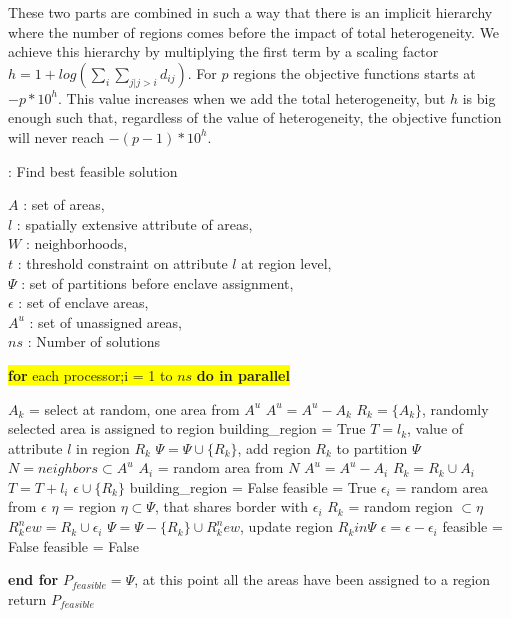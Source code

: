 \documentclass[conference]{IEEEtran}
\begin{document}
These two parts are combined in such a way that there is an implicit
hierarchy where the number of regions comes before the impact of total
heterogeneity. We achieve this hierarchy by multiplying the first term by a
scaling factor $h = 1 + log(\sum_i \sum_{j|j>i} d_{ij})$. For $p$ regions the
objective functions starts at $−p\ast10^h$. This value increases when we add the
total heterogeneity, but $h$ is big enough such that, regardless of the value of
heterogeneity, the objective function will never reach $-(p-1) \ast 10^h$.

\begin{algorithm}
\scriptsize
\caption{: Find best feasible solution~\cite{r1}}
$A$ : set of areas,\\
$l$ : spatially extensive attribute of areas,\\
$W$ : neighborhoods,\\
$t$ : threshold constraint on attribute $l$ at region level,\\
$\Psi$ : set of partitions before enclave assignment,\\
$\epsilon$ : set of enclave areas,\\
$A^u$ : set of unassigned areas,\\
$ns$ : Number of solutions\\
\begin{algorithmic}
\vbox{\colorbox{yellow}{\vbox{\STATE \textbf{for} each processor;i = 1 to $ns$ \textbf{do in parallel}}}} 
\begin{ALC@g}
		\STATE $A_k$ = select at random, one area from $A^u$
		\STATE $A^u = A^u - A_k$
		\STATE $R_k = \{A_k\}$, randomly selected area is assigned to region
		\STATE building\_region = True
		\STATE $T = l_k$, value of attribute $l$ in region $R_k$
				\STATE $\Psi = \Psi \cup \{R_k\}$, add region $R_k$ to partition $\Psi$
			\ELSE
				\STATE $N = neighbors \subset A^u$%
					\STATE $A_i$ = random area from $N$
					\STATE $A^u = A^u - A_i$
					\STATE $R_k = R_k \cup A_i$
					\STATE $T = T + l_i$
				\ELSE
					\STATE $\epsilon \cup \{R_k\}$
					\STATE building\_region = False
				\ENDIF
			\ENDIF
		\ENDWHILE
	\ENDWHILE
		\STATE feasible = True
			\STATE $\epsilon_i$ = random area from $\epsilon$
			\STATE $\eta$ = region $\eta \subset \Psi $, that shares border with $\epsilon_i$
				\STATE $R_k$ = random region $\subset \eta$
				\STATE $R_k^new = R_k \cup \epsilon_i$
				\STATE $\Psi = \Psi - \{R_k\} \cup R_k^new$, update region $R_k in \Psi$
				\STATE $\epsilon = \epsilon - \epsilon_i$
			\ELSE
				\STATE feasible = False
			\ENDIF
		\ENDWHILE
	\ELSE
		\STATE feasible = False
	\ENDIF
\end{ALC@g}
\STATE \textbf{end for}
\STATE $P_{feasible} = \Psi$, at this point all the areas have been assigned to a region
\STATE return $P_{feasible}$
\end{algorithmic}
\end{algorithm}
\end{document}
